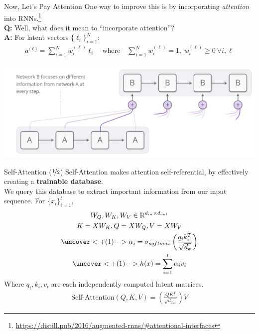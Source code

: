\documentclass{beamer}
\begin{document}
\begin{frame}{Now, Let's Pay Attention}
	One way to improve this is by incorporating \textit{attention} into RNNs.\footnote{\tiny \url{https://distill.pub/2016/augmented-rnns/\#attentional-interfaces}} \pause \newline \\

	\textbf{Q:} Well, what does it mean to ``incorporate attention''? \pause \\
	\textbf{A:} For latent vectors $\{\ell_i\}^N_{i=1}$:
	\begin{gather}
		a^{\langle \ell \rangle} = \sum^{N}_{i=1} w_i^{(\ell)} \ell_i \quad \text{where} \quad \sum^N_{i=1}w_i^{(\ell)} = 1,\ w_i^{(\ell)} \geq 0 ~\forall i, \ell
	\end{gather} \pause

	\begin{center}
		\includegraphics[width=.8\textwidth]{img/rnn-attention.png}
	\end{center}
\end{frame}

\begin{frame}{Self-Attention ($\nicefrac{1}{2}$)}
	Self-Attention makes attention self-referential, by effectively creating a \textbf{trainable database}. \pause \newline \\

	We query this database to extract important information from our input sequence. For $\{x_i\}^t_{i=1}$,
	\begin{gather}
		W_Q, W_K, W_V \in \mathbb{R}^{d_{in} \times d_{out}} \\
		K = X W_K, 
		Q = X W_Q, 
		V = X W_V \\
		\uncover<+(1)->{\alpha_i = \sigma_{softmax}\left(\frac{q_i k_i^T}{\sqrt{d_k}}\right)} \\
		\uncover<+(1)->{h(x) = \sum^t_{i=1} \alpha_i v_i}
	\end{gather} \pause
	Where $q_i, k_i, v_i$ are each independently computed latent matrices.
	\begin{gather}
		\text{Self-Attention}(Q, K, V) = \left(\frac{QK^T}{\sqrt{d_{out}}}\right) V
	\end{gather}
\end{frame}
\end{document}
